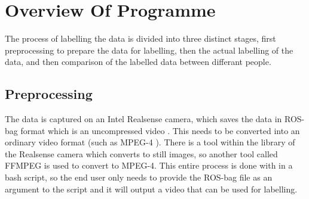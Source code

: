 \section{Overview Of Programme}
The process of labelling the data is divided into three distinct stages, first preprocessing to prepare the data for labelling, then the actual labelling of the data, and then comparison of the labelled data between differant people.
    \subsection{Preprocessing}
    The data is captured on an Intel Realsense camera, which saves the data in ROS-bag format which is an uncompressed video \cite{intelrosbag}. This needs to be converted into an ordinary video format (such as MPEG-4 \cite{wiegand2003overview}). There is a tool within the library of the Realsense camera which converts to still images, so another tool called FFMPEG \cite{ffmpeg} is used to convert to MPEG-4. This entire process is done with in a bash script, so the end user only needs to provide the ROS-bag file as an argument to the script and it will output a video that can be used for labelling.
